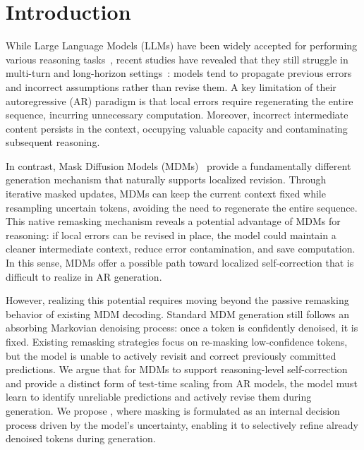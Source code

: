 \section{Introduction}
\label{sec:introduction}


While Large Language Models (LLMs) have been widely accepted for performing various reasoning tasks~\citep{kojima2022large,wang2022self,lightman2023let,wei2022chain}, recent studies have revealed that they still struggle in multi-turn and long-horizon settings~\citep{laban2025llms}: models tend to propagate previous errors and incorrect assumptions rather than revise them. A key limitation of their autoregressive (AR) paradigm is that local errors require regenerating the entire sequence, incurring unnecessary computation. Moreover, incorrect intermediate content persists in the context, occupying valuable capacity and contaminating subsequent reasoning.

In contrast, Mask Diffusion Models (MDMs)~\citep{austin2021structured, sahoo2024simple, nie2025large, xin2025lumina} provide a fundamentally different generation mechanism that naturally supports localized revision. Through iterative masked updates, MDMs can keep the current context fixed while resampling uncertain tokens, avoiding the need to regenerate the entire sequence. This native remasking mechanism reveals a potential advantage of MDMs for reasoning: if local errors can be revised in place, the model could maintain a cleaner intermediate context, reduce error contamination, and save computation. In this sense, MDMs offer a possible path toward localized self-correction that is difficult to realize in AR generation. 

However, realizing this potential requires moving beyond the passive remasking behavior of existing MDM decoding. Standard MDM generation still follows an absorbing Markovian denoising process: once a token is confidently denoised, it is fixed. Existing remasking strategies focus on re-masking low-confidence tokens, but the model is unable to actively revisit and correct previously committed predictions. We argue that for MDMs to support reasoning-level self-correction and provide a distinct form of test-time scaling from AR models, the model must learn to identify unreliable predictions and actively revise them during generation. We propose \textbf{\methodfull}, where masking is formulated as an internal decision process driven by the model's uncertainty, enabling it to selectively refine already denoised tokens during generation.

